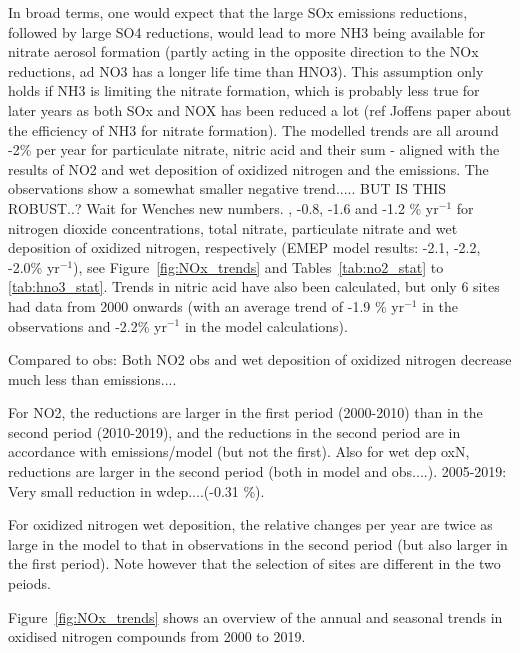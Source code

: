 In broad terms, one would expect that the large SOx emissions reductions, followed by large SO4 reductions, would lead to more NH3 being available for nitrate aerosol formation (partly acting in the opposite direction to the NOx reductions, ad NO3 has a longer life time than HNO3). This assumption only holds if NH3 is limiting the nitrate formation, which is probably less true for later years as both SOx and NOX has been reduced a lot (ref Joffens paper about the efficiency of NH3 for nitrate formation). The modelled trends are all around -2\% per year for particulate nitrate, nitric acid and their sum - aligned with the results of NO2 and wet deposition of oxidized nitrogen and the emissions. The observations show a somewhat smaller negative trend..... BUT IS THIS ROBUST..? Wait for Wenches new numbers.
, -0.8, -1.6 and -1.2 \% yr$^{-1}$ for nitrogen dioxide concentrations, total nitrate, particulate nitrate and wet deposition of oxidized nitrogen, respectively (EMEP model results: -2.1, -2.2, -2.0\% yr$^{-1}$), see Figure~\ref{fig:NOx_trends} and Tables~\ref{tab:no2_stat} to \ref{tab:hno3_stat}. Trends in nitric acid have also been calculated, but only 6 sites had data from 2000 onwards (with an average trend of -1.9 \% yr$^{-1}$ in the observations and -2.2\% yr$^{-1}$ in the model calculations). 

Compared to obs: Both NO2 obs and wet deposition of oxidized nitrogen decrease much less than emissions....

For NO2, the reductions are larger in the first period (2000-2010) than in the second period (2010-2019), and the reductions in the second period are in accordance with emissions/model (but not the first). Also for wet dep oxN, reductions are larger in the second period (both in model and obs....). 2005-2019: Very small reduction in wdep....(-0.31 \%).

For oxidized nitrogen wet deposition, the relative changes per year are twice as large in the model to that in observations in the second period (but also larger in the first period). Note however that the selection of sites are different in the two peiods.


Figure~\ref{fig:NOx_trends} shows an overview of the annual and seasonal trends in oxidised nitrogen compounds from 2000 to 2019.

